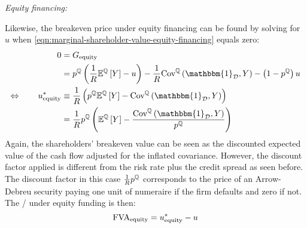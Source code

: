 \documentclass[main.tex]{subfiles}
\begin{document}
            \noindent
            \textit{Equity financing:} \par
            Likewise, the breakeven price under equity financing can be found by solving for $u$
            when \cref{eqn:marginal-shareholder-value-equity-financing} equals zero:
                \begin{align}
                    0 &= G_{\text{equity}} 
                        \nonumber \\
                    &=
                        p^{\mathbb{Q}} \left(
                            \discountfactor
                            \mathbb{E}^{\mathbb{Q}}\left[Y\right]
                            - u
                        \right)
                        -
                        \discountfactor
                        \text{Cov}^{\mathbb{Q}}\left(\mathbbm{1}_{\mathcal{D}}, Y\right) 
                        - 
                        \left(
                            1
                            -
                            p^{\mathbb{Q}}
                        \right)
                        u 
                        \nonumber \\
                    \Leftrightarrow \qquad
                    u_{\text{equity}}^{\ast}
                    &\equiv
                        \discountfactor
                        \left(
                            p^{\mathbb{Q}}
                            \mathbb{E}^{\mathbb{Q}}\left[Y\right]
                            -
                            \text{Cov}^{\mathbb{Q}}\left(\mathbbm{1}_{\mathcal{D}}, Y\right) 
                        \right)
                        \nonumber \\
                    &= 
                        \discountfactor
                        p^{\mathbb{Q}}
                        \left(
                            \mathbb{E}^{\mathbb{Q}}\left[Y\right]
                            -
                            \frac{
                                \text{Cov}^{\mathbb{Q}}\left(\mathbbm{1}_{\mathcal{D}}, Y\right)
                            }{
                                p^{\mathbb{Q}}  
                            }  
                        \right)
                    \label{eqn:shareholders-breakeven-equity-financing}
                \end{align}
            Again, the shareholders' breakeven value can be seen as the discounted expected value of the cash flow
            adjusted for the inflated covariance.
            However, the discount factor applied is different from the risk rate plus the credit spread as seen before.
            The discount factor in this case $\frac{1}{R} p^{\mathbb{Q}}$ corresponds to 
            the price of an Arrow-Debreu security paying one unit of numeraire if the firm defaults and zero if not.
            The \FVA/ under equity funding is then:
                \begin{equation}
                    \FVA/_{\text{equity}} 
                        = u^{\ast}_{\text{equity}} - u
                    \label{eqn:fva-equity-financing}
                \end{equation}
\end{document}
